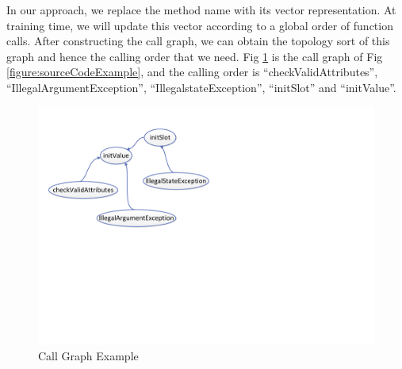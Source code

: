 In our approach, we replace the method name with its vector representation.
At training time, we will update this vector according to a global order of
function calls. After constructing the call graph, we can obtain the
topology sort of this graph and hence the calling order that we need.
Fig \ref{figure:callGraph} is the call graph of
Fig \ref{figure:sourceCodeExample}, and the calling order is
``checkValidAttributes'', ``IllegalArgumentException'', ``IllegalstateException'', ``initSlot''  and ``initValue''.


\begin{figure}[ht]
 \centering
 \includegraphics[width=0.7\columnwidth]{img/callGraph.pdf}
 \caption{\label{figure:callGraph} Call Graph Example}
\end{figure}

